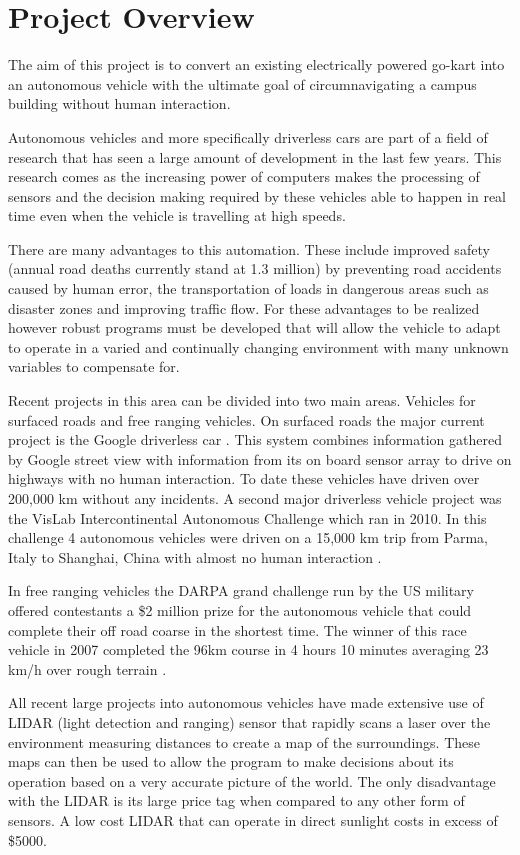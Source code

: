 \chapter{Project Overview}

The aim of this project is to convert an existing electrically powered go-kart into an autonomous vehicle with the ultimate goal of circumnavigating a campus building without human interaction.

Autonomous vehicles and more specifically driverless cars are part of a field of research that has seen a large amount of development in the last few years. This research comes as the increasing power of computers makes the processing of sensors and the decision making required by these vehicles able to happen in real time even when the vehicle is travelling at high speeds.

There are many advantages to this automation. These include improved safety (annual road deaths currently stand at 1.3 million\cite{WHO}) by preventing road accidents caused by human error, the transportation of loads in dangerous areas such as disaster zones and improving traffic flow. For these advantages to be realized however robust programs must be developed that will allow the vehicle to adapt to operate in a varied and continually changing environment with many unknown variables to compensate for.

Recent projects in this area can be divided into two main areas. Vehicles for surfaced roads and free ranging vehicles. On surfaced roads the major current project is the Google driverless car \cite{google_car_blog}. This system combines information gathered by Google street view with information from its on board sensor array to drive on highways with no human interaction. To date these vehicles have driven over 200,000 km without any incidents. A second major driverless vehicle project was the VisLab Intercontinental Autonomous Challenge which ran in 2010. In this challenge 4 autonomous vehicles were driven on a 15,000 km trip from Parma, Italy to Shanghai, China with almost no human interaction \cite{vislab}.

 In free ranging vehicles the DARPA grand challenge run by the US military offered contestants a \$2 million prize for the autonomous vehicle that could complete their off road coarse in the shortest time. The winner of this race vehicle in 2007 completed the 96km course in 4 hours 10 minutes averaging 23 km/h over rough terrain \cite{darpa}.

All recent large projects into autonomous vehicles have made extensive use of LIDAR (light detection and ranging) sensor that rapidly scans a laser over the environment measuring distances to create a map of the surroundings. These maps can then be used to allow the program to make decisions about its operation based on a very accurate picture of the world. The only disadvantage with the LIDAR is its large price tag when compared to any other form of sensors. A low cost LIDAR that can operate in direct sunlight costs in excess of \$5000. 


